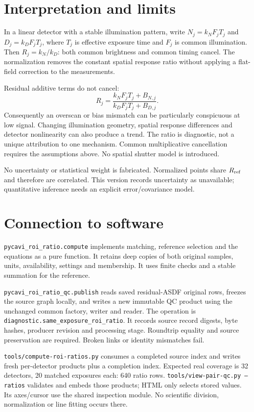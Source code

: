 \documentclass[11pt,a4paper]{article}
\begin{document}
\newpage
\section*{Interpretation and limits}
In a linear detector with a stable illumination pattern, write
$N_j=k_N F_j T_j$ and $D_j=k_D F_j T_j$, where $T_j$ is effective exposure time
and $F_j$ is common illumination. Then $R_j=k_N/k_D$: both common brightness
and common timing cancel. The normalization removes the constant spatial
response ratio without applying a flat-field correction to the measurements.

Residual additive terms do not cancel:
\begin{equation}
R_j=\frac{k_N F_j T_j+B_{N,j}}{k_D F_j T_j+B_{D,j}}.
\end{equation}
Consequently an overscan or bias mismatch can be particularly conspicuous at
low signal. Changing illumination geometry, spatial response differences and
detector nonlinearity can also produce a trend. The ratio is diagnostic, not
a unique attribution to one mechanism. Common multiplicative cancellation
requires the assumptions above. No spatial shutter model is introduced.

No uncertainty or statistical weight is fabricated. Normalized points share
$R_{\rm ref}$ and therefore are correlated. This version records uncertainty
as unavailable; quantitative inference needs an explicit error/covariance model.

\section*{Connection to software}
\texttt{pycavi\_roi\_ratio.compute} implements matching, reference selection and
the equations as a pure function. It retains deep copies of both original
samples, units, availability, settings and membership. It uses finite checks
and a stable summation for the reference.

\texttt{pycavi\_roi\_ratio\_qc.publish} reads saved residual-ASDF original rows,
freezes the source graph locally, and writes a new immutable QC product using
the unchanged common factory, writer and reader. The operation is
\texttt{diagnostic.same\_exposure\_roi\_ratio}. It records source record digests,
byte hashes, producer revision and processing stage. Roundtrip equality and
source preservation are required. Broken links or identity mismatches fail.

\texttt{tools/compute-roi-ratios.py} consumes a completed source index and
writes fresh per-detector products plus a completion index. Expected real
coverage is 32 detectors, 20 matched exposures each: 640 ratio rows.
\texttt{tools/view-pair-qc.py --ratios} validates and embeds those products;
HTML only selects stored values. Its axes/cursor use the shared inspection
module. No scientific division, normalization or line fitting occurs there.
\end{document}
